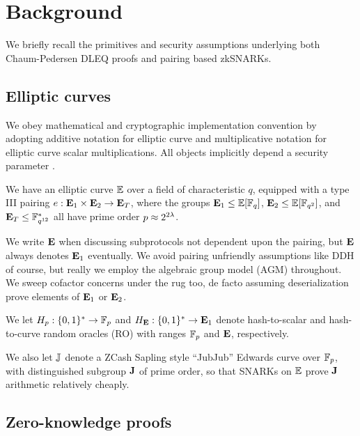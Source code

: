 
\section{Background}
\label{sec:thin_background}

We briefly recall the primitives and security assumptions underlying
both Chaum-Pedersen DLEQ proofs and pairing based zkSNARKs. 

\subsection{Elliptic curves}

We obey mathematical and cryptographic implementation convention by 
adopting additive notation for elliptic curve and multiplicative notation
for elliptic curve scalar multiplications.
%
All objects implicitly depend a security parameter \secparam.

We have an elliptic curve ${\mathbb{E}}$ over a field of characteristic $q$,
equipped with a type III pairing $e : {\mathbf{E}}_1 \times {\mathbf{E}}_2 \to {\mathbf{E}}_T$,
where the groups  ${\mathbf{E}}_1 \le {\mathbb{E}}[\mathbb{F}_q]$, ${\mathbf{E}}_2 \le {\mathbb{E}}[\mathbb{F}_{q^2}]$,
and ${\mathbf{E}}_T \le \mathbb{F}^*_{q^{12}}$ all have prime order $p \approx 2^{2\lambda}$.

We write ${\mathbf{E}}$ when discussing subprotocols not dependent upon the
pairing, but ${\mathbf{E}}$ always denotes ${\mathbf{E}}_1$ eventually.
We avoid pairing unfriendly assumptions like DDH of course, but really
we employ the algebraic group model (AGM) throughout.
We sweep cofactor concerns under the rug too, de facto assuming
deserialization prove elements of ${\mathbf{E}}_1$ or ${\mathbf{E}}_2$.

We let $H_p : \{0,1\}^* \to \mathbb{F}_p$ and $H_{\mathbf{E}} : \{0,1\}^* \to {\mathbf{E}}_1$
denote hash-to-scalar and hash-to-curve random oracles (RO) with ranges
$\mathbb{F}_p$ and ${\mathbf{E}}$, respectively.  

We also let ${\mathbb{J}}$ denote a ZCash Sapling style ``JubJub'' Edwards curve
over $\mathbb{F}_p$, with distinguished subgroup ${\mathbf{J}}$ of prime order, so that
SNARKs on ${\mathbb{E}}$ prove ${\mathbf{J}}$ arithmetic relatively cheaply.


\subsection{Zero-knowledge proofs}

\newcommand\rel{\ensuremath{\mathcal{R}}\xspace}
\newcommand\lang{\ensuremath{\mathcal{L}}\xspace}

